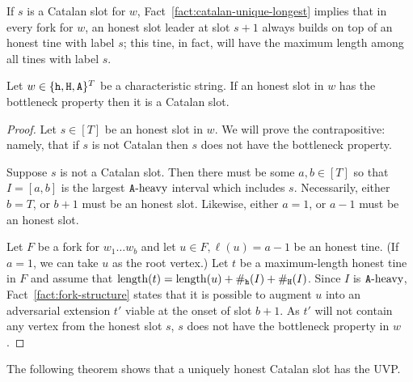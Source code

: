 \begin{observation}\label{obs:multi-honest}
  If $s$ is a Catalan slot for $w$, Fact~\ref{fact:catalan-unique-longest} implies that 
  in every fork for $w$, 
  an honest slot leader at slot $s + 1$ always 
  builds on top of an honest tine with label $s$; 
  this tine, in fact, will have the maximum length among all tines with label $s$.
\end{observation}



\begin{fact}\label{fact:almost-cp-implies-catalan}
  Let $w \in \{\mathtt{h}, \mathtt{H}, \mathtt{A}\}^T$ be a characteristic string. 
  If an honest slot in $w$ has the bottleneck property then 
  it is a Catalan slot.
\end{fact}
\begin{proof}
  Let $s \in [T]$ be an honest slot in $w$.  
  We will prove the contrapositive: namely, 
  that if $s$ is not Catalan then $s$ does not have the bottleneck property. 
  
  Suppose $s$ is not a Catalan slot.
  Then there must be some $a, b \in [T]$ so that 
  $I = [a, b]$ is the largest $\mathtt{A}\text{-heavy}$ interval 
  which includes $s$. 
  Necessarily, either $b = T$, or $b + 1$ must be an honest slot. 
  Likewise, either $a = 1$, or $a - 1$ must be an honest slot. 
  
  Let $F$ be a fork for $w_1 \ldots w_b$ 
  and let $u \in F, \ell(u) = a - 1$ be an honest tine. 
  (If $a = 1$, we can take $u$ as the root vertex.)  
  Let $t$ be a maximum-length honest tine in $F$ 
  and assume that $\operatorname{length}(t) = \operatorname{length}(u) + \#_{\mathtt{h}}(I) + \#_{\mathtt{H}}(I)$.
  Since $I$ is $\mathtt{A}\text{-heavy}$, 
  Fact~\ref{fact:fork-structure} 
  states that 
  it is possible to augment $u$ into 
  an adversarial extension $t'$ 
  viable at the onset of slot $b + 1$. 
  As $t'$ will not contain any vertex from the honest slot $s$,  
  $s$ does not have the bottleneck property in $w$.
\end{proof}


The following theorem shows that a uniquely honest Catalan slot has the UVP.





